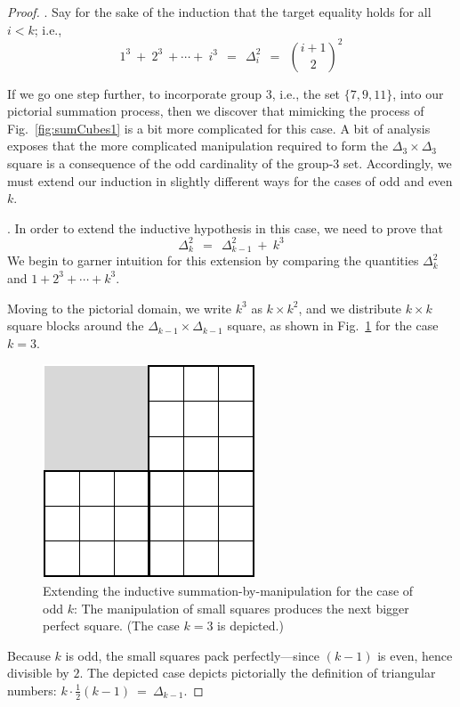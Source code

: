 \begin{proof}
\medskip

.
Say for the sake of the induction that the target equality holds for all $i < k$; i.e.,
\[ 1^3 \ + \ 2^3 \ + \cdots + \ i^3 \ \ = \ \ \Delta_i^2 \ \ = \ \ {{i+1} \choose 2}^2 \]

\medskip

If we go one step further, to incorporate group $3$, i.e., the set $\{7, 9, 11\}$, into our pictorial summation process, then we discover that mimicking the process of Fig.~\ref{fig:sumCubes1} is a bit more complicated for this case.  A bit of analysis exposes that the more complicated manipulation required to form the $\Delta_3 \times \Delta_3$ square is a consequence of the odd cardinality of the group-$3$ set.  Accordingly, we must extend our induction in slightly different ways for the cases of odd and even $k$.

\medskip

.
In order to extend the inductive hypothesis in this case, we need to prove that
\[ \Delta_k^2 \ \ = \ \ \Delta_{k-1}^2 \ + \ k^3 \]
We begin to garner intuition for this extension by comparing the quantities $\Delta_k^2$ and $1 + 2^3 + \cdots + k^3$.

\smallskip

Moving to the pictorial domain, we write $k^3$ as $k \times k^2$, and we distribute $k \times k$ square blocks around the $\Delta_{k-1} \times \Delta_{k-1}$ square, as shown in Fig.~\ref{fig:sumCubes3} for the case $k=3$. 
\begin{figure}[ht]
\begin{center}
       \includegraphics[scale=0.35]{FiguresMaths/SumCubes3}
\caption{Extending the inductive summation-by-manipulation for the case of odd $k$:  The manipulation of small squares produces the next bigger perfect square.  (The case $k=3$ is depicted.)}
       \label{fig:sumCubes3}
\end{center}
\end{figure}
Because $k$ is odd, the small squares pack perfectly---since $(k-1)$ is even, hence divisible by $2$.   The depicted case depicts pictorially the definition of triangular numbers: $k \cdot \frac{1}{2}(k-1) \ = \ \Delta_{k-1}$.


\end{proof}
